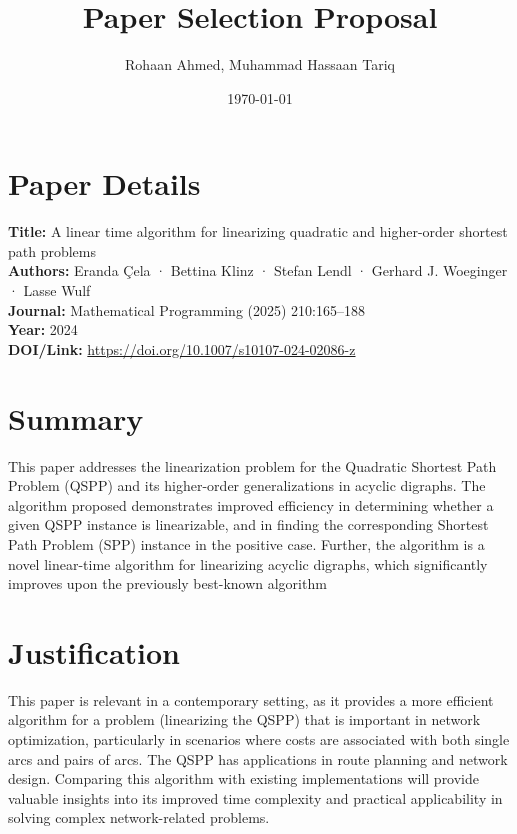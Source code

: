 \documentclass{article}
\title{Paper Selection Proposal}
\author{Rohaan Ahmed, Muhammad Hassaan Tariq}
\date{\today}
\begin{document}
\maketitle

\section{Paper Details}
\textbf{Title:} A linear time algorithm for linearizing quadratic and
higher-order shortest path problems\\
\textbf{Authors:} Eranda Çela · Bettina Klinz · Stefan Lendl ·
Gerhard J. Woeginger · Lasse Wulf\\
\textbf{Journal:} Mathematical Programming (2025) 210:165–188\\
\textbf{Year:} 2024\\
\textbf{DOI/Link:} \href{https://doi.org/10.1007/s10107-024-02086-z}{https://doi.org/10.1007/s10107-024-02086-z}

\section{Summary}
This paper addresses the linearization problem for the Quadratic Shortest Path Problem (QSPP) and its higher-order generalizations in acyclic digraphs. The algorithm proposed demonstrates improved efficiency in determining whether a given QSPP instance is linearizable, and in finding the corresponding Shortest Path Problem (SPP) instance in the positive case. Further, the algorithm is a novel linear-time algorithm for linearizing acyclic digraphs, which significantly improves upon the previously best-known algorithm

\section{Justification}
This paper is relevant in a contemporary setting, as it provides a more efficient algorithm for a problem (linearizing the QSPP) that is important in network optimization, particularly in scenarios where costs are associated with both single arcs and pairs of arcs.  The QSPP has applications in route planning and network design.  Comparing this algorithm with existing implementations will provide valuable insights into its improved time complexity and practical applicability in solving complex network-related problems.
\end{document}
